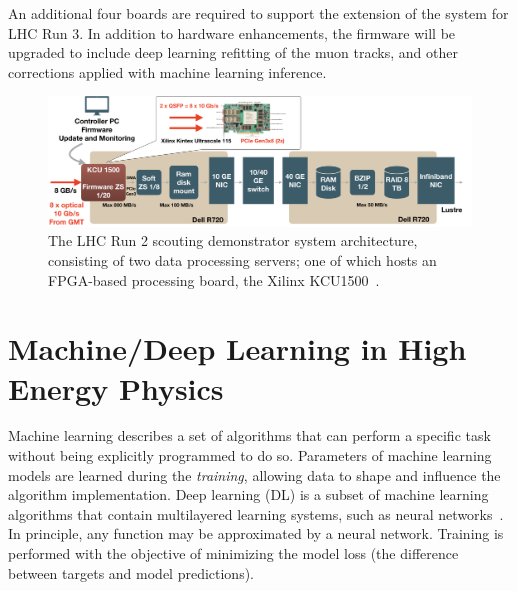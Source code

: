 \documentclass[10pt, paper=a4, UKenglish]{article}
\begin{document}
An additional four boards are required to support the extension of the system for LHC Run 3. In addition to hardware enhancements, the firmware will be upgraded to include deep learning refitting of the muon tracks, and other corrections applied with machine learning inference.

\begin{figure}[!htb]
    \centering
    \captionsetup[subfigure]{labelformat=empty}
    \includegraphics[height=0.2417\linewidth]{./images/scouting_prot_kcu.png}
    \caption{The LHC Run 2 scouting demonstrator system architecture, consisting of two data processing servers; one of which hosts an FPGA-based processing board, the Xilinx KCU1500~\cite{kcu}.}
    \label{fig:scouting_arch}
\end{figure}

\section{Machine/Deep Learning in High Energy Physics}
\label{Machine/Deep Learning in High Energy Physics}

Machine learning describes a set of algorithms that can perform a specific task without being explicitly programmed to do so. Parameters of machine learning models are learned during the \textit{training}, allowing data to shape and influence the algorithm implementation. Deep learning (DL) is a subset of machine learning algorithms that contain multilayered learning systems, such as neural networks~\cite{DL}. In principle, any function may be approximated by a neural network. Training is performed with the objective of minimizing the model loss (the difference between targets and model predictions).
\end{document}
